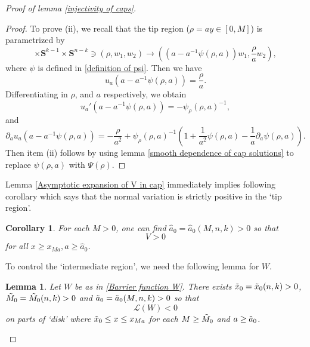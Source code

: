 \documentclass[pdflatex,sn-mathphys-num]{sn-jnl}
\newtheorem{lemma}[theorem]{Lemma}
\newtheorem{corollary}[theorem]{Corollary}
\begin{document}
\begin{proof}[Proof of lemma \ref{injectivity of caps}]
\begin{proof}
    To prove (ii), we recall that the tip region ($\rho = ay \in [0, M]$) is parametrized by
    \begin{equation}
        [0,M] \times \mathbf{S}^{k-1}\times \mathbf{S}^{n-k} \ni (\rho, w_1, w_2) \to ((a - a^{-1}\psi(\rho, a))w_1, \frac{\rho}{a}w_2),
    \end{equation}
where $\psi$ is defined in \eqref{definition of psi}. Then we have 
\begin{equation}
    u_a(a - a^{-1}\psi(\rho, a)) = \frac{\rho}{a}.
\end{equation}
Differentiating in $\rho$, and $a$ respectively, we obtain
\begin{equation*}
     u_a'(a - a^{-1}\psi(\rho, a)) = -\psi_{\rho}(\rho, a)^{-1}, 
\end{equation*}
and
\begin{equation*}
    \partial_au_a(a - a^{-1}\psi(\rho, a)) = -\frac{\rho}{a^2} +\psi_{\rho}(\rho, a)^{-1}(1 + \frac{1}{a^2}\psi(\rho, a) - \frac{1}{a}\partial_a\psi(\rho, a)).
\end{equation*}
Then item (ii) follows by using lemma \ref{smooth dependence of cap solutions} to replace $\psi(\rho, a)$ with $\Psi(\rho)$. 
\end{proof}
Lemma \ref{Asymptotic expansion of V in cap} immediately implies following corollary which says that the normal variation is strictly positive in the `tip region'. 
\begin{corollary}\label{nonvanishing of normal variation at tip}
    For each $M > 0$, one can find $\hat{a}_0 = \hat{a}_0(M, n,k) > 0$ so that $$V > 0$$
for all $x \geq x_{Ma}, a \geq \hat{a}_0$. 
\end{corollary}
To control the `intermediate region', we 
need the following lemma for $W$.
\begin{lemma}\label{properties of W on disk}
    Let $W$ be as in \eqref{Barrier function W}. There exists $\Tilde{x}_0 = \Tilde{x}_0(n,k) > 0$, $\Tilde{M}_0 = \Tilde{M}_0(n,k) > 0$ and $\Tilde{a}_0 = \Tilde{a}_0(M, n,k) > 0$ so that
    $$\mathcal{L}(W) < 0$$
    on parts of `disk' where $\Tilde{x}_0 \leq x \leq x_{Ma}$ for each $M \geq \Tilde{M}_0$ and $a \geq \Tilde{a}_0$.\\
    

\end{lemma}
\end{proof}
\end{document}
